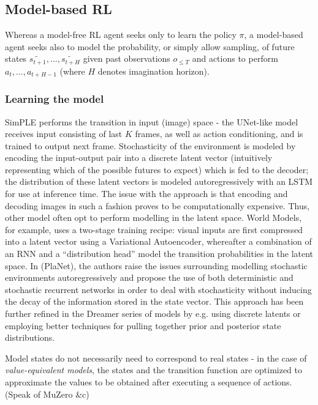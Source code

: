 \documentclass[twoside,11pt]{article}
\begin{document}
\subsection{Model-based RL}

Whereas a model-free RL agent seeks only to learn the policy $\pi$, a model-based agent seeks also to model the probability, or simply allow sampling, of future states $\widetilde{s_{t+1}}, \ldots, \widetilde{s_{t+H}}$ given past observations $o_{\leq T}$ and actions to perform $a_{t}, \ldots, a_{t+H-1}$ (where $H$ denotes imagination horizon).

\subsubsection{Learning the model}

SimPLE performs the transition in input (image) space - the UNet-like model receives input consisting of last $K$ frames, as well as action conditioning, and is trained to output next frame. Stochasticity of the environment is modeled by encoding the input-output pair into a discrete latent vector (intuitively representing which of the possible futures to expect) which is fed to the decoder; the distribution of these latent vectors is modeled autoregressively with an LSTM for use at inference time. The issue with the approach is that encoding and decoding images in such a fashion proves to be computationally expensive. Thus, other model often opt to perform modelling in the latent space. World Models, for example, uses a two-stage training recipe: visual inputs are first compressed into a latent vector using a Variational Autoencoder, whereafter a combination of an RNN and a ``distribution head'' model the transition probabilities in the latent space. In (PlaNet), the authors raise the issues surrounding modelling stochastic environments autoregressively and propose the use of both deterministic and stochastic recurrent networks in order to deal with stochasticity without inducing the decay of the information stored in the state vector. This approach has been further refined in the Dreamer series of models by e.g. using discrete latents or employing better techniques for pulling together prior and posterior state distributions.

Model states do not necessarily need to correspond to real states - in the case of \emph{value-equivalent models}, the states and the transition function are optimized to approximate the values to be obtained after executing a sequence of actions. (Speak of MuZero \&c)
\end{document}
